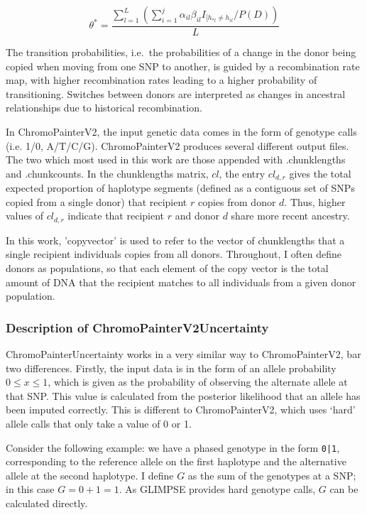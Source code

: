 \begin{equation}
\theta^{*} = \frac{\sum_{l=1}^{L}(\sum_{i=1}^{j} \alpha_{il} \beta_{il} I_{[h_{*l} \neq h_{il}} / P(D)
)}{L}
\end{equation} 

The transition probabilities, i.e.\ the probabilities of a change in the donor being copied when moving from one SNP to another, is guided by a recombination rate map, with higher recombination rates leading to a higher probability of transitioning. Switches between donors are interpreted as changes in ancestral relationships due to historical recombination.

In ChromoPainterV2, the input genetic data comes in the form of genotype calls (i.e. 1/0, A/T/C/G). ChromoPainterV2 produces several different output files. The two which most used in this work are those appended with .chunklengths and .chunkcounts. In the chunklengths matrix, $cl$, the entry $cl_{d,r}$ gives the total expected proportion of haplotype segments (defined as a contiguous set of SNPs copied from a single donor) that recipient $r$ copies from donor $d$. Thus, higher values of $cl_{d,r}$ indicate that recipient $r$ and donor $d$ share more recent ancestry. 

In this work, 'copyvector' is used to refer to the vector of chunklengths that a single recipient individuals copies from all donors. Throughout, I often define donors as populations, so that each element of the copy vector is the total amount of DNA that the recipient matches to all individuals from a given donor population.

\subsubsection{Description of ChromoPainterV2Uncertainty} \label{sec:DescriptionChromoPainterV2Uncertainty}

ChromoPainterUncertainty works in a very similar way to ChromoPainterV2, bar two differences. Firstly, the input data is in the form of an allele probability $0 \leq x \leq 1$, which is given as the probability of observing the alternate allele at that SNP. This value is calculated from the posterior likelihood that an allele has been imputed correctly. This is different to ChromoPainterV2, which uses `hard' allele calls that only take a value of 0 or 1.

Consider the following example: we have a phased genotype in the form \texttt{0|1}, corresponding to the reference allele on the first haplotype and the alternative allele at the second haplotype. I define $G$ as the sum of the genotypes at a SNP; in this case $G=0+1=1$. As GLIMPSE provides hard genotype calls, $G$ can be calculated directly.

